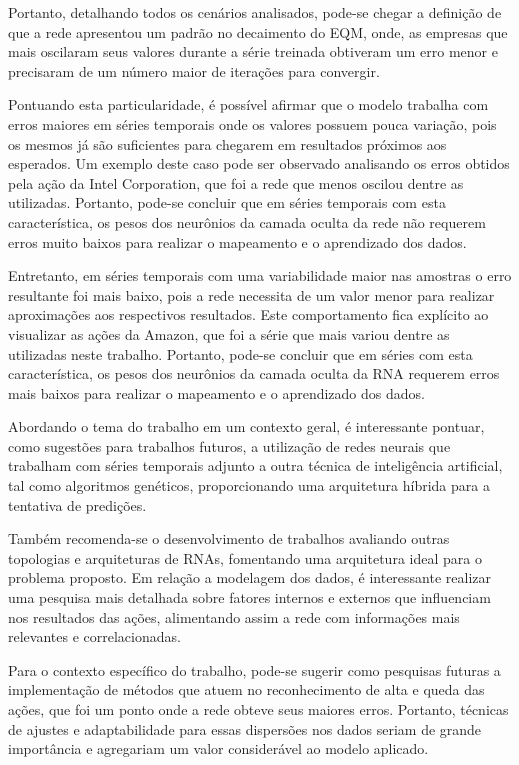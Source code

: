 Portanto, detalhando todos os cenários analisados, pode-se chegar a definição de que a rede apresentou um padrão no decaimento do EQM, onde, as empresas que mais oscilaram seus valores durante a série treinada obtiveram um erro menor e precisaram de um número maior de iterações para convergir. 

Pontuando esta particularidade, é possível afirmar que o modelo trabalha com erros maiores em séries temporais onde os valores possuem pouca variação, pois os mesmos já são suficientes para chegarem em resultados próximos aos esperados. Um exemplo deste caso pode ser observado analisando os erros obtidos pela ação da Intel Corporation, que foi a rede que menos oscilou dentre as utilizadas. Portanto, pode-se concluir que em séries temporais com esta característica, os pesos dos neurônios da camada oculta da rede não requerem erros muito baixos para realizar o mapeamento e o aprendizado dos dados. 

Entretanto, em séries temporais com uma variabilidade maior nas amostras o erro resultante foi mais baixo, pois a rede necessita de um valor menor para realizar aproximações aos respectivos resultados. Este comportamento fica explícito ao visualizar as ações da Amazon, que foi a série que mais variou dentre as utilizadas neste trabalho. Portanto, pode-se concluir que em séries com esta característica, os pesos dos neurônios da camada oculta da RNA requerem erros mais baixos para realizar o mapeamento e o aprendizado dos dados.

Abordando o tema do trabalho em um contexto geral, é interessante pontuar, como sugestões para trabalhos futuros, a utilização de redes neurais que trabalham com séries temporais adjunto a outra técnica de inteligência artificial, tal como algoritmos genéticos, proporcionando uma arquitetura híbrida para a tentativa de predições. 

Também recomenda-se o desenvolvimento de trabalhos avaliando outras topologias e arquiteturas de RNAs, fomentando uma arquitetura ideal para o problema proposto. Em relação a modelagem dos dados, é interessante realizar uma pesquisa mais detalhada sobre fatores internos e externos que influenciam nos resultados das ações, alimentando assim a rede com informações mais relevantes e correlacionadas.

Para o contexto específico do trabalho, pode-se sugerir como pesquisas futuras a implementação de métodos que atuem no reconhecimento de alta e queda das ações, que foi um ponto onde a rede obteve seus maiores erros. Portanto, técnicas de ajustes e adaptabilidade para essas dispersões nos dados seriam de grande importância e agregariam um valor considerável ao modelo aplicado.